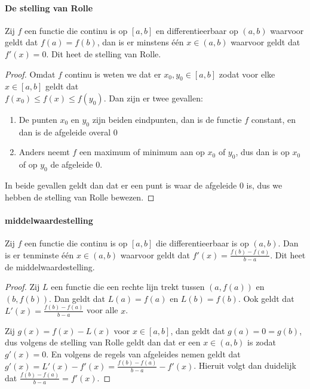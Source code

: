 \label{sec:AE}
\paragraph{De stelling van Rolle} Zij $f$ een functie die continu is op $[a,b]$ en differentieerbaar op $(a,b)$ waarvoor geldt dat $f(a)=f(b)$, dan is er minstens één $x\in(a,b)$ waarvoor geldt dat $f'(x)=0$. Dit heet de stelling van Rolle.

\begin{proof}
  Omdat $f$ continu is weten we dat er $x_{0},y_{0}\in[a,b]$ zodat voor elke $x\in[a,b]$ geldt dat\\ $f(x_{0})\leq f(x)\leq f(y_{0})$. Dan zijn er twee gevallen:

  \begin{enumerate}
    \setlength\itemsep{0em}
    \item De punten $x_{0}$ en $y_{0}$ zijn beiden eindpunten, dan is de functie $f$ constant, en dan is de afgeleide overal $0$
    \item Anders neemt $f$ een maximum of minimum aan op $x_{0}$ of $y_{0}$, dus dan is op $x_{0}$ of op $y_{0}$ de afgeleide $0$.
  \end{enumerate}

  \noindent In beide gevallen geldt dan dat er een punt is waar de afgeleide $0$ is, dus we hebben de stelling van Rolle bewezen.
\end{proof}

\paragraph{middelwaardestelling} Zij $f$ een functie die continu is op $[a,b]$ die differentieerbaar is op $(a,b)$. Dan is er tenminste één $x\in(a,b)$ waarvoor geldt dat $f'(x)=\frac{f(b)-f(a)}{b-a}$. Dit heet de middelwaardestelling.

\begin{proof}

Zij $L$ een functie die een rechte lijn trekt tussen $(a,f(a))$ en $(b,f(b))$. Dan geldt dat $L(a)=f(a)$ en $L(b)=f(b)$. Ook geldt dat $L'(x)=\frac{f(b)-f(a)}{b-a}$ voor alle $x$. \medskip

\noindent Zij $g(x)=f(x)-L(x)$ voor $x\in[a,b]$, dan geldt dat $g(a)=0=g(b)$, dus volgens de stelling van Rolle geldt dan dat er een $x\in(a,b)$ is zodat $g'(x)=0$. En volgens de regels van afgeleides nemen geldt dat $g'(x)=L'(x)-f'(x)=\frac{f(b)-f(a)}{b-a}-f'(x)$. Hieruit volgt dan duidelijk dat $\frac{f(b)-f(a)}{b-a}=f'(x)$.

\end{proof}
